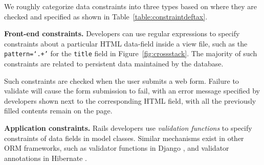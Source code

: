 
We roughly categorize data constraints into three types based on where they are checked and specified
as shown in Table~\ref{table:constraintdeftax}.


\textbf{Front-end constraints.} 
Developers can use regular expressions to specify constraints
about a particular HTML data-field inside a view file, such as the {\tt pattern=`.+'} for the {\tt title}
field %
in Figure~\ref{fig:crossstack}. The majority of such constraints are related to persistent data maintained by the database.
 
Such constraints are checked when the user submits a web form. Failure to validate will cause the form submission to fail, with an error message specified by developers shown next to the corresponding HTML field, with all the previously filled contents remain on the page.


\textbf{Application constraints.} 
Rails developers use {\it validation functions} to specify constraints of data fields in model classes.
Similar mechanisms exist in other ORM frameworks, such as validator functions in Django \cite{django-annotation}, and validator annotations in Hibernate \cite{hibernate-annotation}.




